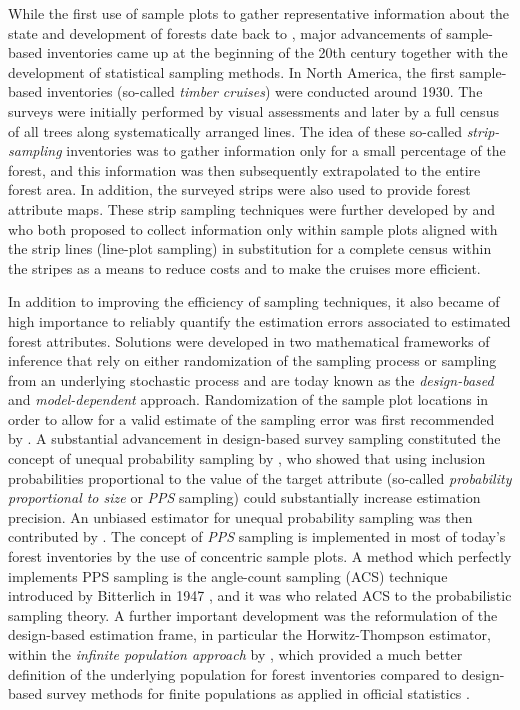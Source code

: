 While the first use of sample plots to gather representative information about the state and development of forests date back to \citet{hartig1795}, major advancements of sample-based inventories came up at the beginning of the 20th century together with the development of statistical sampling methods. In North America, the first sample-based inventories (so-called \textit{timber cruises}) were conducted around 1930. The surveys were initially performed by visual assessments and later by a full census of all trees along systematically arranged lines. The idea of these so-called \textit{strip-sampling} inventories was to gather information only for a small percentage of the forest, and this information was then subsequently extrapolated to the entire forest area. In addition, the surveyed strips were also used to provide forest attribute maps. These strip sampling techniques were further developed by \citet{goodspeed1934} and \citet{langballe1938} who both proposed to collect information only within sample plots aligned with the strip lines (line-plot sampling) in substitution for a complete census within the stripes as a means to reduce costs and to make the cruises more efficient.\par 

In addition to improving the efficiency of sampling techniques, it also became of high importance to reliably quantify the estimation errors associated to estimated forest attributes. Solutions were developed in two mathematical frameworks of inference that rely on either randomization of the sampling process or sampling from an underlying stochastic process and are today known as the \textit{design-based} and \textit{model-dependent} approach. Randomization of the sample plot locations in order to allow for a valid estimate of the sampling error was first recommended by \citet{hasel1938}. A substantial advancement in design-based survey sampling constituted the concept of unequal probability sampling by \citet{hansen1943}, who showed that using inclusion probabilities proportional to the value of the target attribute (so-called \textit{probability proportional to size} or \textit{PPS} sampling) could substantially increase estimation precision. An unbiased estimator for unequal probability sampling was then contributed by \citet{horvitz1952}. The concept of \textit{PPS} sampling is implemented in most of today's forest inventories by the use of concentric sample plots. A method which perfectly implements PPS sampling is the angle-count sampling (ACS) technique introduced by Bitterlich in 1947 \citep{bitterlich1984}, and it was \citet{grosenbaugh1958} who related ACS to the probabilistic sampling theory. A further important development was the reformulation of the design-based estimation frame, in particular the Horwitz-Thompson estimator, within the \textit{infinite population approach} by \citet{mandallaz1991}, which provided a much better definition of the underlying population for forest inventories compared to design-based survey methods for finite populations as applied in official statistics \citep[e.g.]{sarndal2003}.\par

